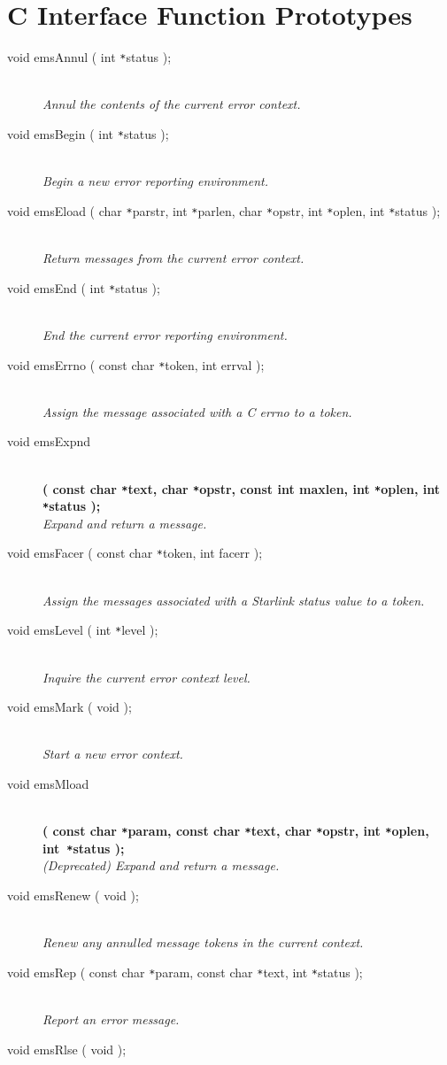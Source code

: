 \documentclass[twoside,11pt]{article}
\newcommand{\xlabel}[1]{}
\renewcommand{\_}{\texttt{\symbol{95}}}
\newcommand{\listline}{\hspace{1pt}\\}
\newcommand{\listline}{}
\begin{document}
\newpage
\section{\xlabel{c_interface_function_prototypes}C Interface Function
Prototypes} \label{C_sect}
\begin {description} 
\item[void emsAnnul ( int \texttt{*}status );] \listline
\textit{Annul the contents of the current error context.}
\item[void emsBegin ( int \texttt{*}status );] \listline
\textit{Begin a new error reporting environment.}
\item[void emsEload
( char \texttt{*}parstr, int \texttt{*}parlen, char \texttt{*}opstr, 
int \texttt{*}oplen, int \texttt{*}status );] \listline
\textit{Return messages from the current error context.}
\item[void emsEnd ( int \texttt{*}status );] \listline
\textit{End the current error reporting environment.}
\item[void emsErrno ( const char \texttt{*}token, int errval );] \listline
\textit{Assign the message associated with a C errno to a token.}
\item[void emsExpnd] \listline
\textbf{( const char \texttt{*}text, char \texttt{*}opstr,
const int maxlen, int \texttt{*}oplen, int \texttt{*}status );} \\
\textit{Expand and return a message.}
\item[void emsFacer ( const char \texttt{*}token, int facerr );] \listline
\textit{Assign the messages associated with a Starlink status value to a
token.}
\item[void emsLevel ( int \texttt{*}level );] \listline
\textit{Inquire the current error context level.}
\item[void emsMark ( void );] \listline
\textit{Start a new error context.}
\item[void emsMload] \listline 
\textbf{( const char \texttt{*}param, const char \texttt{*}text, 
char \texttt{*}opstr, int \texttt{*}oplen, int~\texttt{*}status );} \\
\textit{(Deprecated) Expand and return a message.}
\item[void emsRenew ( void );] \listline
\textit{Renew any annulled message tokens in the current context.}
\item[void emsRep ( const char \texttt{*}param, const char \texttt{*}text, 
int \texttt{*}status );] \listline
\textit{Report an error message.}
\item[void emsRlse ( void );] \listline

\end{description}
\end{document}
